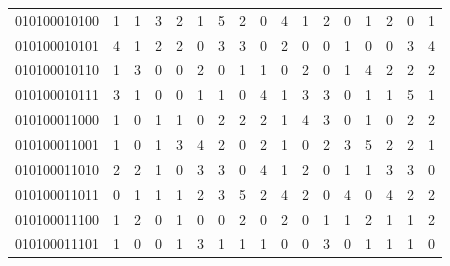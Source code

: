 \documentclass[10pt,a4paper]{article}
\begin{document}
\begin{longtable}{ |c|c|c|c|c|c|c|c|c|c|c|c|c|c|c|c|c| }
    010100010100              & 1                            & 1                                & 3                            & 2                              & 1   & 5   & 2   & 0   & 4   & 1   & 2   & 0   & 1   & 2   & 0   & 1   \\
    010100010101              & 4                            & 1                                & 2                            & 2                              & 0   & 3   & 3   & 0   & 2   & 0   & 0   & 1   & 0   & 0   & 3   & 4   \\
    010100010110              & 1                            & 3                                & 0                            & 0                              & 2   & 0   & 1   & 1   & 0   & 2   & 0   & 1   & 4   & 2   & 2   & 2   \\
    010100010111              & 3                            & 1                                & 0                            & 0                              & 1   & 1   & 0   & 4   & 1   & 3   & 3   & 0   & 1   & 1   & 5   & 1   \\
    010100011000              & 1                            & 0                                & 1                            & 1                              & 0   & 2   & 2   & 2   & 1   & 4   & 3   & 0   & 1   & 0   & 2   & 2   \\
    010100011001              & 1                            & 0                                & 1                            & 3                              & 4   & 2   & 0   & 2   & 1   & 0   & 2   & 3   & 5   & 2   & 2   & 1   \\
    010100011010              & 2                            & 2                                & 1                            & 0                              & 3   & 3   & 0   & 4   & 1   & 2   & 0   & 1   & 1   & 3   & 3   & 0   \\
    010100011011              & 0                            & 1                                & 1                            & 1                              & 2   & 3   & 5   & 2   & 4   & 2   & 0   & 4   & 0   & 4   & 2   & 2   \\
    010100011100              & 1                            & 2                                & 0                            & 1                              & 0   & 0   & 2   & 0   & 2   & 0   & 1   & 1   & 2   & 1   & 1   & 2   \\
    010100011101              & 1                            & 0                                & 0                            & 1                              & 3   & 1   & 1   & 1   & 0   & 0   & 3   & 0   & 1   & 1   & 1   & 0   \\

\end{longtable}
\end{document}
